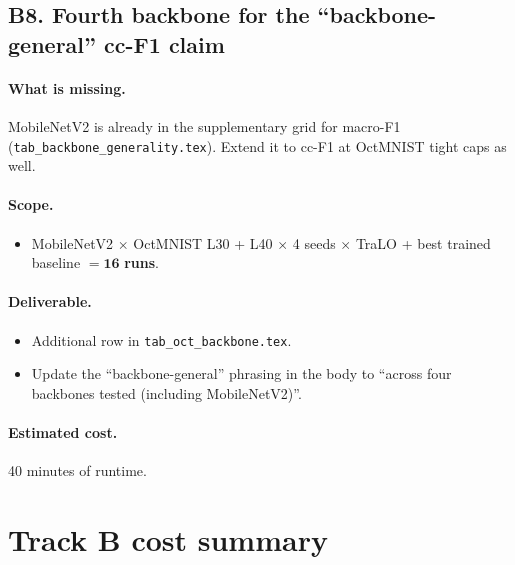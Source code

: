 \documentclass[11pt,a4paper]{article}
\newcommand{\file}[1]{\texttt{#1}}
\begin{document}
\subsection{B8. Fourth backbone for the ``backbone-general'' cc-F1 claim}

\paragraph{What is missing.} MobileNetV2 is already in the supplementary
grid for macro-F1 (\file{tab\_backbone\_generality.tex}). Extend it to
cc-F1 at OctMNIST tight caps as well.

\paragraph{Scope.}
\begin{itemize}[nosep]
  \item MobileNetV2 $\times$ OctMNIST L30 + L40 $\times$ 4 seeds $\times$
        TraLO + best trained baseline $= \mathbf{16}$ \textbf{runs}.
\end{itemize}

\paragraph{Deliverable.}
\begin{itemize}[nosep]
  \item Additional row in \file{tab\_oct\_backbone.tex}.
  \item Update the ``backbone-general'' phrasing in the body to ``across
        four backbones tested (including MobileNetV2)''.
\end{itemize}

\paragraph{Estimated cost.} 40 minutes of runtime.

\section{Track B cost summary}
\end{document}
